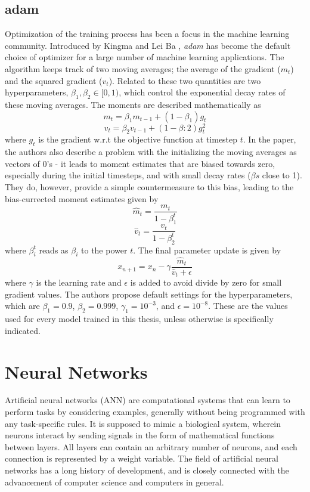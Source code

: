 \subsection{adam}
Optimization of the training process has been a focus in the machine learning
community. Introduced by Kingma and Lei Ba \cite{Kingma2015}, \textit{adam} has
become the default choice of optimizer for a large number of machine learning
applications. The algorithm keeps track of two moving averages; the average of the
gradient ($m_t$) and the squared gradient ($v_t$). Related to these two quantities
are two hyperparameters, $\beta_1, \beta_2 \in [0,1)$, which control the exponential
decay rates of these moving averages. The moments are described mathematically as
\begin{equation}
	m_t = \beta_1 m_{t-1} + (1 - \beta_1)g_t
\end{equation}
\begin{equation}
	v_t = \beta_2 v_{t-1} + (1 - \beta:2)g_t^2
\end{equation}
where $g_t$ is the gradient w.r.t the objective function at timestep $t$.
In the paper, the authors also describe a problem with the initializing the moving
averages as vectors of 0's - it leads to moment estimates that are biased towards
zero, especially during the initial timesteps, and with small decay rates ($\beta s$
close to 1). They do, however, provide a simple countermeasure to this bias, leading
to the bias-currected moment estimates given by
\begin{equation}
	\hat{m}_t = \frac{m_t}{1 - \beta_1^t}
\end{equation}
\begin{equation}
	\hat{v}_t = \frac{v_t}{1 - \beta_2^t}
\end{equation}
where $\beta_i^t$ reads as $\beta_i$ to the power $t$.
The final parameter update is given by
\begin{equation}
	x_{n+1} = x_n - \gamma\frac{\hat{m}_t}{\hat{v}_t + \epsilon}
\end{equation}
where $\gamma$ is the learning rate and $\epsilon$ is added to avoid divide by zero
for small gradient values. The authors propose default settings for the hyperparameters, which are
$\beta_1 = 0.9$, $\beta_2 = 0.999$, $\gamma_1 = 10^{-3}$, and $\epsilon = 10^{-8}$.
These are the values used for every model trained in this thesis, unless otherwise
is specifically indicated.


\section{Neural Networks}
Artificial neural networks (ANN) are computational systems that can learn to
perform tasks by considering examples, generally without being
programmed with any task-specific rules. It is supposed to mimic a
biological system, wherein neurons interact by sending signals in the
form of mathematical functions between layers. All layers can contain
an arbitrary number of neurons, and each connection is represented by
a weight variable.
The field of artificial neural networks has a long history of
development, and is closely connected with the advancement of computer
science and computers in general.

